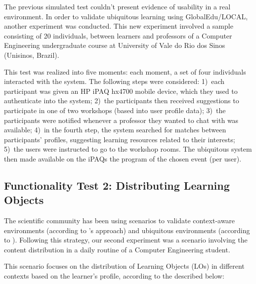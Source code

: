 \documentclass[5p,authoryear]{elsarticle}
\begin{document}
The previous simulated test couldn't present evidence of usability in a real
environment. In order to validate ubiquitous learning using GlobalEdu/LOCAL,
another experiment was conducted. This new experiment involved a sample
consisting of 20 individuals, between learners and professors of a Computer
Engineering undergraduate course at University of Vale do Rio dos Sinos
(Unisinos, Brazil).

This test was realized into five moments: each moment, a set of four
individuals interacted with the system. The following steps were considered:
1)~each participant was given an HP iPAQ hx4700 mobile device, which they used
to authenticate into the system; 2)~the participants then received suggestions
to participate in one of two workshops (based into user profile data); 3)~the
participants were notified whenever a professor they wanted to chat with was
available; 4)~in the fourth step, the system searched for matches between
participants' profiles, suggesting learning resources related to their
interests; 5)~the users were instructed to go to the workshop rooms. The
ubiquitous system then made available on the iPAQs the program of the chosen
event (per user). 

%
%
\subsection{Functionality Test 2: Distributing Learning Objects}

The scientific community has been using scenarios to validate context-aware
environments (according to \citet{dey2001}'s approach) and ubiquitous
environments (according to \citet{satyanarayanan01}). Following this strategy,
our second experiment was a scenario involving the content distribution in a
daily routine of a Computer Engineering student.

This scenario focuses on the distribution of Learning Objects (LOs) in
different contexts based on the learner’s profile, according to the described
below:
\end{document}
